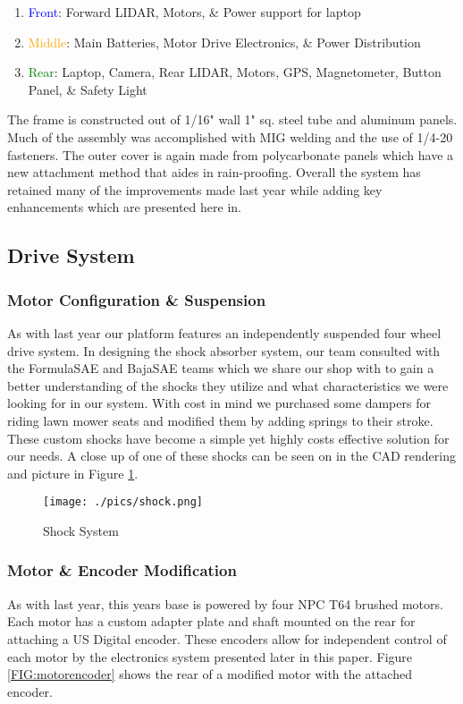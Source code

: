 \begin{enumerate}
\item \textcolor{blue}{Front}: Forward LIDAR, Motors, \& Power support for laptop
\item \textcolor{Orange}{Middle}: Main Batteries, Motor Drive Electronics, \& Power Distribution
\item \textcolor{green}{Rear}: Laptop, Camera, Rear LIDAR, Motors, GPS, Magnetometer, Button Panel, \& Safety Light
\end{enumerate}

The frame is constructed out of 1/16" wall 1" sq. steel tube and aluminum panels. Much of the assembly was accomplished with MIG welding and the use of 1/4-20 fasteners. The outer cover is again made from polycarbonate panels which have a new attachment method that aides in rain-proofing. Overall the system has retained many of the improvements made last year while adding key enhancements which are presented here in. 

\subsection{Drive System}
\subsubsection{Motor Configuration \& Suspension}
As with last year our platform features an independently suspended four wheel drive system. In designing the shock absorber system, our team consulted with the FormulaSAE and BajaSAE teams which we share our shop with to gain a better understanding of the shocks they utilize and what characteristics we were looking for in our system. With cost in mind we purchased some dampers for riding lawn mower seats and modified them by adding springs to their stroke. These custom shocks have become a simple yet highly costs effective solution for our needs. A close up of one of these shocks can be seen on in the CAD rendering and picture in Figure \ref{FIG:Shock}.

\begin{figure}[H]
\begin{center}
\texttt{[image: ./pics/shock.png]}
\caption{Shock System}
\label{FIG:Shock}
\end{center}
\end{figure}

\subsubsection{Motor \& Encoder Modification}
As with last year, this years base is powered by four NPC T64 brushed motors. Each motor has a custom adapter plate and shaft mounted on the rear for attaching a US Digital encoder. These encoders allow for independent control of each motor by the electronics system presented later in this paper. Figure \ref{FIG:motorencoder} shows the rear of a modified motor with the attached encoder.

